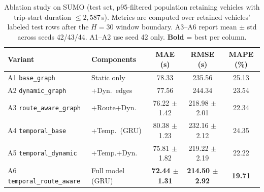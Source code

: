\documentclass[pdflatex,sn-basic,Numbered]{sn-jnl}%
\begin{document}
\begin{table}[t]
    \centering
    \caption{Ablation study on SUMO (test set, p95-filtered population retaining vehicles with trip-start duration $\leq 2{,}587$\,s). Metrics are computed over retained vehicles' labeled test rows after the $H{=}30$ window boundary. A3--A6 report mean $\pm$ std across seeds 42/43/44. A1--A2 use seed 42 only. \textbf{Bold} = best per column.}
    \label{tab:ablation_sumo_p95}
    {\footnotesize\setlength{\tabcolsep}{4pt}%
    \begin{tabular}{@{}llccc@{}}
        \toprule
        \textbf{Variant} & \textbf{Components} & \textbf{MAE (s)} & \textbf{RMSE (s)} & \textbf{MAPE (\%)} \\
        \midrule
        A1 \texttt{base\_graph}            & Static only         & 78.33 & 235.56 & 25.13 \\
        A2 \texttt{dynamic\_graph}         & +Dyn.\ edges        & 77.56 & 244.34 & 23.54 \\
        A3 \texttt{route\_aware\_graph}    & +Route+Dyn.\        & 76.22 $\pm$ 1.42 & 218.98 $\pm$ 2.01 & 22.34 \\
        A4 \texttt{temporal\_base}         & +Temp.\ (GRU)       & 80.38 $\pm$ 1.23 & 232.16 $\pm$ 2.12 & 24.35 \\
        A5 \texttt{temporal\_dynamic}      & +Temp.+Dyn.\        & 75.81 $\pm$ 1.82 & 219.22 $\pm$ 2.19 & 22.22 \\
        A6 \texttt{temporal\_route\_aware} & Full model (GRU)    & \textbf{72.44 $\pm$ 1.31} & \textbf{214.50 $\pm$ 2.92} & \textbf{19.71} \\
        \bottomrule
    \end{tabular}}%
\end{table}
\end{document}
